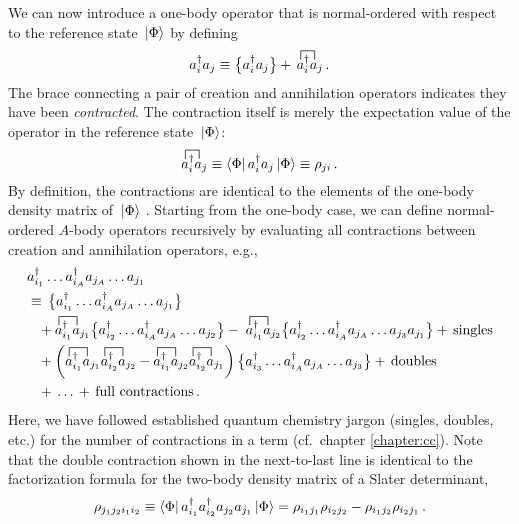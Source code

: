 We can now introduce a one-body operator that is normal-ordered with respect
to the reference state $\,|{\Phi}\rangle$ by defining
\begin{equation}\label{eq:def_no}
  \aaO_i\aO_j \equiv \nord{\aaO_i\aO_j} +\, \contraction[1.5ex]{}{\aO}{{}^\dag_i}{\aO}\aaO_i\aO_j\,.
\end{equation}
The brace connecting a pair of creation and annihilation operators indicates
they have been \emph{contracted}. The contraction itself is merely the 
expectation value of the operator in the reference state $\,|{\Phi}\rangle$:
\begin{equation}\label{eq:def_particle_contraction}
  \contraction[1.5ex]{}{\aO}{{}^\dag_i}{\aO}\aaO_i\aO_j \equiv \matrixe{\Phi}{\aaO_i\aO_j}{\Phi} \equiv \rho_{ji} \,.
\end{equation}
By definition, the contractions are identical to the elements of the one-body 
density matrix of $\,|{\Phi}\rangle$ \cite{Ring:1980bb}. Starting from the one-body
case, we can define normal-ordered $A$-body operators recursively by evaluating 
all contractions between creation and annihilation operators, e.g., 
\begin{align}\label{eq:def_no_nbody}
   &\aaO_{i_1}\ldots\aaO_{i_A}\aO_{j_A}\ldots\aO_{j_1} \notag\\
    &\equiv\, \nord{\aaO_{i_1}\ldots\aaO_{i_A}\aO_{j_{A}}\ldots\aO_{j_{1}}} \notag\\
    &\hphantom{\equiv}
       + \contraction[1.5ex]{}{\aO}{{}^\dag_{i_1}}{\aO}\aaO_{i_1}\aO_{j_1} 
        \nord{\aaO_{i_2}\ldots\aaO_{i_A}\aO_{j_{A}}\ldots\aO_{j_{2}}} 
      -\; \contraction[1.5ex]{}{\aO}{{}^\dag_{i_1}}{\aO}\aaO_{i_1}\aO_{j_2} 
        \nord{\aaO_{i_2}\ldots\aaO_{i_A}\aO_{j_A}\ldots\aO_{j_{3}}\aO_{j_{1}}}
      + \text{\,singles}\notag\\
    &\hphantom{\equiv}
       + \left(
          \contraction[1.5ex]{}{\aO}{{}^\dag_{i_1}}{\aO}\aaO_{i_1}\aO_{j_1}
          \contraction[1.5ex]{}{\aO}{{}^\dag_{i_1}}{\aO}\aaO_{i_2}\aO_{j_2}
          -
          \contraction[1.5ex]{}{\aO}{{}^\dag_{i_1}}{\aO}\aaO_{i_1}\aO_{j_2}
          \contraction[1.5ex]{}{\aO}{{}^\dag_{i_1}}{\aO}\aaO_{i_2}\aO_{j_1}
        \right) 
        \nord{\aaO_{i_3}\ldots\aaO_{i_A}\aO_{j_A}\ldots\aO_{j_{3}}} + \text{\,doubles} \notag\\
    &\hphantom{\equiv}
  +\,\ldots\,+ \text{\,full contractions}\,.
\end{align}
Here, we have followed established quantum chemistry jargon (singles, doubles, 
etc.) for the number of contractions in a term (cf.~chapter \ref{chapter:cc}).
Note that the double contraction shown in the next-to-last line is identical
to the factorization formula for the two-body density matrix of a Slater 
determinant,
\begin{equation}
  \rho_{j_1j_2i_1i_2}
  \equiv
  \langle{\Phi}|\,{a^\dag_{i_1}a^\dag_{i_2}a_{j_2}a_{j_1}}\,|{\Phi}\rangle
  = \rho_{i_1j_1}\rho_{i_2j_2}- \rho_{i_1j_2}\rho_{i_2j_1}\,.
\end{equation}

